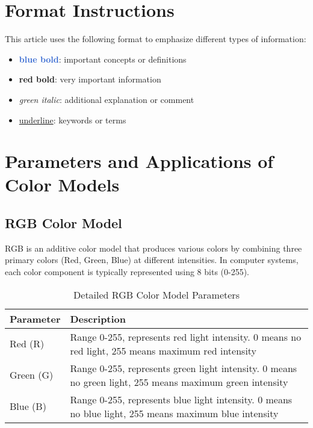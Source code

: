 \documentclass[12pt]{article}
\begin{document}


\section*{Format Instructions}
This article uses the following format to emphasize different types of information:
\begin{itemize}
    \item \textcolor{highlight}{\textbf{blue bold}}: important concepts or definitions
    \item \textcolor{important}{\textbf{red bold}}: very important information
    \item \textcolor{note}{\textit{green italic}}: additional explanation or comment
    \item \underline{underline}: keywords or terms
\end{itemize}

\section{Parameters and Applications of Color Models}

\subsection{RGB Color Model}
RGB is an additive color model that produces various colors by combining three primary colors (Red, Green, Blue) at different intensities. In computer systems, each color component is typically represented using 8 bits (0-255).

\begin{table}[H]
    \centering
    \begin{tabular}{lp{12cm}}
    \toprule
    \textbf{Parameter} & \textbf{Description} \\
    \midrule
    Red (R) & Range 0-255, represents red light intensity. 0 means no red light, 255 means maximum red intensity \\
    Green (G) & Range 0-255, represents green light intensity. 0 means no green light, 255 means maximum green intensity \\
    Blue (B) & Range 0-255, represents blue light intensity. 0 means no blue light, 255 means maximum blue intensity \\
    \bottomrule
    \end{tabular}
    \caption{Detailed RGB Color Model Parameters}
\end{table}
\end{document}
